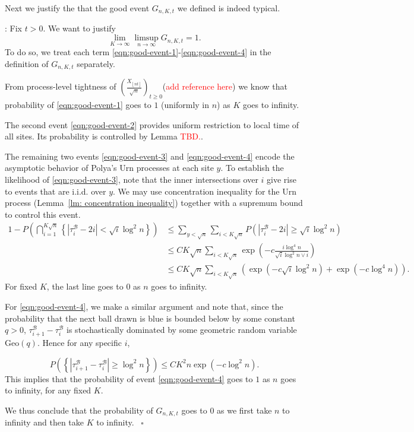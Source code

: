 \documentclass[twoside,12pt,a4paper]{article}
\numberwithin{equation}{section}
\newenvironment{proof}[1][Proof]{{\sc #1}:}{~\hfill $\square$}
\newcommand\TBD{\textcolor{red}{TBD.}}
\newcommand{\edt}[1]{\textcolor{red}{#1}} %
\begin{document}
\vspace{2em}

Next we justify the that the good event $G_{n, K, t}$ we defined is indeed typical.

\begin{proof}[Proof of Lemma~\ref{lem:good-event}]
	Fix $t>0$. We want to justify
	\[
		\lim_{K\to \infty } \limsup_{n \to \infty } G_{n, K, t} = 1
	.\] 
	To do so, we treat each term \eqref{eqn:good-event-1}-\eqref{eqn:good-event-4} in the definition of $G_{n, K, t}$ separately.

	From process-level tightness of $\left( \frac{X_{\left\lfloor nt  \right\rfloor}}{\sqrt{n} } \right)_{t \ge 0} $(\edt{add reference here}) we know that probability of \eqref{eqn:good-event-1} goes to $1$ (uniformly in $n$) as $K $ goes to infinity. 

	The second event \eqref{eqn:good-event-2} provides uniform restriction to local time of all sites. Its probability is controlled by Lemma \TBD.

	The remaining two events \eqref{eqn:good-event-3} and \eqref{eqn:good-event-4} encode the asymptotic behavior of Polya's Urn processes at each site $y$. To establish the likelihood of \eqref{eqn:good-event-3}, note that the inner intersections over $i$ give rise to events that are i.i.d. over $y$. We may use concentration inequality for the Urn process (Lemma~\ref{lm: concentration inequality}) together with a supremum bound to control this event.
\begin{align*}
	1-P\left(\bigcap_{i = 1}^{K \sqrt{n} } \left\{\left| \tau_i^{\mathcal{B}} - 2 i \right| < \sqrt{ i } \log^2 n \right\}
\right) 
	&\le \sum_{y < \sqrt{n} }\sum_{i < K \sqrt{ n} } P\left( |\tau_i^{\mathcal{B}} - 2i| \ge \sqrt{i} \log^2 n \right) \\
	&\le CK \sqrt{n} \sum_{i < K \sqrt{ n} } \exp\left( - c \frac{i \log^4 n}{\sqrt{i}  \log^2 n \vee i} \right)  \\
	&\le CK \sqrt{n}  \sum_{i < K \sqrt{ n} }  
	\left( \exp\left( - c \sqrt{i}  \log^2 n \right)  + 
	\exp\left( - c \log^4 n \right) \right)
.\end{align*}
For fixed $K$, the last line goes to $0$ as $n$ goes to infinity. 

For \eqref{eqn:good-event-4}, we make a similar argument and note that, since the probability that the next ball drawn is blue is bounded below by some constant $q > 0$, $\tau_{i+1}^{\mathcal{B}} - \tau_{i}^{\mathcal{B}}$ is stochastically dominated by some geometric random variable $\text{Geo}(q)$. Hence for any specific $i$,

\[
	P\left(\left\{\left| \tau_{i+1}^{\mathcal{B}} - \tau_i^{\mathcal{B}} \right| \ge  \log^2 n \right\}\right) 
	\le C K^2 n \exp\left( - c \log^2 n \right) 
.\] 
This implies that the probability of event \eqref{eqn:good-event-4} goes to $1$ as $n$ goes to infinity, for any fixed $K$.

	We thus conclude that the probability of $G_{n, K, t}$ goes to $0$ as we first take $n$ to infinity and then take $K$ to infinity.
\end{proof}
\end{document}
